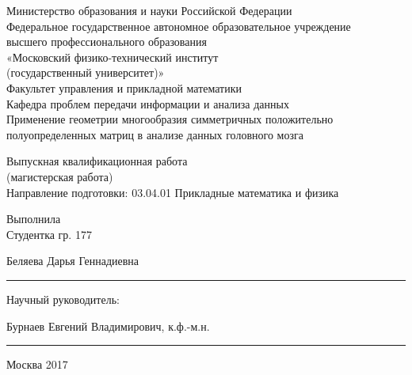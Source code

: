 \begin{titlepage}
\begin{center}

\small Министерство образования и науки Российской Федерации\\[0.7cm]

\small Федеральное государственное автономное образовательное учреждение \\ высшего профессионального образования \\ «Московский физико-технический институт \\ (государственный университет)»\\[0.6cm]

Факультет управления и прикладной математики\\[0.2cm] 
\small Кафедра проблем передачи информации и анализа данных\\[1.2cm]

{\Large Применение геометрии многообразия симметричных положительно полуопределенных матриц в анализе данных головного мозга\\[0.4cm] }


Выпускная квалификационная работа \\ (магистерская работа)\\[1.0cm]
Направление подготовки: 03.04.01  Прикладные математика и физика\\[1.5cm]

\begin{minipage}[t]{1.0\textwidth}

\begin{flushleft}
Выполнила \\
Студентка гр. 177
\end{flushleft}
\begin{flushright}
Беляева Дарья Геннадиевна \\
\noindent\hrule
\end{flushright}

\begin{flushleft}
Научный руководитель:
\end{flushleft}
\begin{flushright}
Бурнаев Евгений Владимирович, к.ф.-м.н.\\
\noindent\hrule
\end{flushright}

\end{minipage}

\vfill

{\small Москва 2017}

\end{center}
\end{titlepage}